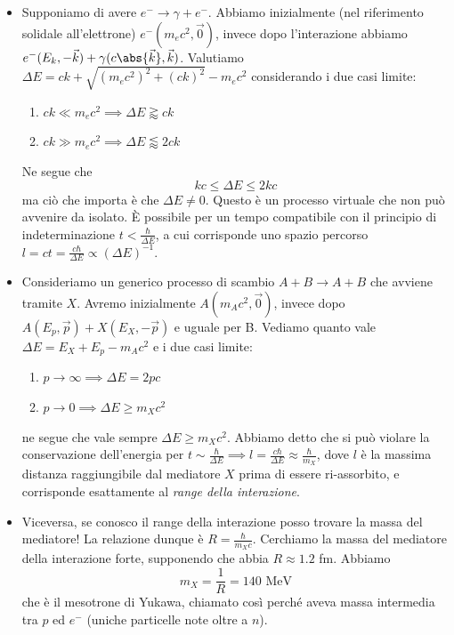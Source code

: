 \begin{itemize}
    \item Supponiamo di avere $e^-\to\gamma+e^-$. Abbiamo inizialmente (nel riferimento solidale all'elettrone) $e^-(m_ec^2,\vec0)$, invece dopo l'interazione abbiamo $e^-(E_k,-\vec k)+\gamma(c\abs{\vec k},\vec k)$. Valutiamo $\Delta E= ck+\sqrt{(m_ec^2)^2+(ck)^2}-m_ec^2$ considerando i due casi limite:
    \begin{enumerate}
        \item $ck\ll m_ec^2\implies \Delta E \gtrapprox ck$
        \item $ck\gg m_ec^2\implies \Delta E \lessapprox 2ck$
    \end{enumerate}
    Ne segue che 
    \begin{equation*}
        kc\leq\Delta E\leq2kc
    \end{equation*}
    ma ciò che importa è che $\Delta E\neq0$. Questo è un processo virtuale che non può avvenire da isolato. È possibile per un tempo compatibile con il principio di indeterminazione $t<\frac\hbar{\Delta E}$, a cui corrisponde uno spazio percorso $l=ct=\frac{c\hbar}{\Delta E}\propto(\Delta E)^{-1}$.
    \item Consideriamo un generico processo di scambio $A+B\to A+B$ che avviene tramite $X$. Avremo inizialmente $A(m_Ac^2,\vec0)$, invece dopo $A(E_p,\vec p)+X(E_X,-\vec p)$ e uguale per B. Vediamo quanto vale $\Delta E= E_X+E_p-m_Ac^2$ e i due casi limite:
    \begin{enumerate}
        \item $p\to\infty\implies \Delta E=2pc$
        \item $p\to0\implies\Delta E \geq m_Xc^2$
    \end{enumerate}
    ne segue che vale sempre $\Delta E\geq m_Xc^2$. Abbiamo detto che si può violare la conservazione dell'energia per $t\sim\frac\hbar{\Delta E}\implies l=\frac{c\hbar}{\Delta E}\approx\frac\hbar{m_X}$, dove $l$ è la massima distanza raggiungibile dal mediatore $X$ prima di essere ri-assorbito, e corrisponde esattamente al \textit{range della interazione}. 
    \item Viceversa, se conosco il range della interazione posso trovare la massa del mediatore! La relazione dunque è $R=\frac\hbar{m_Xc}$. Cerchiamo la massa del mediatore della interazione forte, supponendo che abbia $R\approx 1.2$ fm. Abbiamo 
    \begin{equation*}
    m_X=\frac1R=140\text{ MeV}
    \end{equation*}
    che è il mesotrone di Yukawa, chiamato così perché aveva massa intermedia tra $p$ ed $e^-$ (uniche particelle note oltre a $n$).

\end{itemize}
